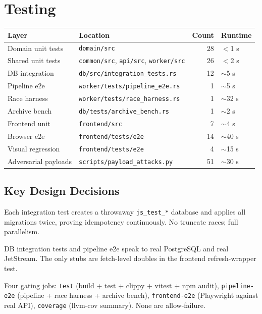 \documentclass[11pt,a4paper]{article}
\begin{document}
\section{Testing}

\begin{table}[h]
\centering
\begin{tabular}{llrl}
\toprule
\textbf{Layer} & \textbf{Location} & \textbf{Count} & \textbf{Runtime} \\
\midrule
Domain unit tests & \texttt{domain/src} & 28 & $<$1 s \\
Shared unit tests & \texttt{common/src}, \texttt{api/src}, \texttt{worker/src} & 26 & $<$2 s \\
DB integration & \texttt{db/src/integration\_tests.rs} & 12 & $\sim$5 s \\
Pipeline e2e & \texttt{worker/tests/pipeline\_e2e.rs} & 1 & $\sim$5 s \\
Race harness & \texttt{worker/tests/race\_harness.rs} & 1 & $\sim$32 s \\
Archive bench & \texttt{db/tests/archive\_bench.rs} & 1 & $\sim$2 s \\
Frontend unit & \texttt{frontend/src} & 7 & $\sim$4 s \\
Browser e2e & \texttt{frontend/tests/e2e} & 14 & $\sim$40 s \\
Visual regression & \texttt{frontend/tests/e2e} & 4 & $\sim$15 s \\
Adversarial payloads & \texttt{scripts/payload\_attacks.py} & 51 & $\sim$30 s \\
\bottomrule
\end{tabular}
\end{table}

\subsection{Key Design Decisions}

\begin{description}[style=nextline]
\item[Per-test databases] Each integration test creates a throwaway
\texttt{js\_test\_*} database and applies all migrations twice, proving
idempotency continuously. No truncate races; full parallelism.
\item[No mocks below unit layer] DB integration tests and pipeline e2e speak
to real PostgreSQL and real JetStream. The only stubs are fetch-level doubles
in the frontend refresh-wrapper test.
\item[CI topology] Four gating jobs: \texttt{test} (build + test + clippy +
vitest + npm audit), \texttt{pipeline-e2e} (pipeline + race harness + archive
bench), \texttt{frontend-e2e} (Playwright against real API), \texttt{coverage}
(llvm-cov summary). None are allow-failure.
\end{description}
\end{document}
